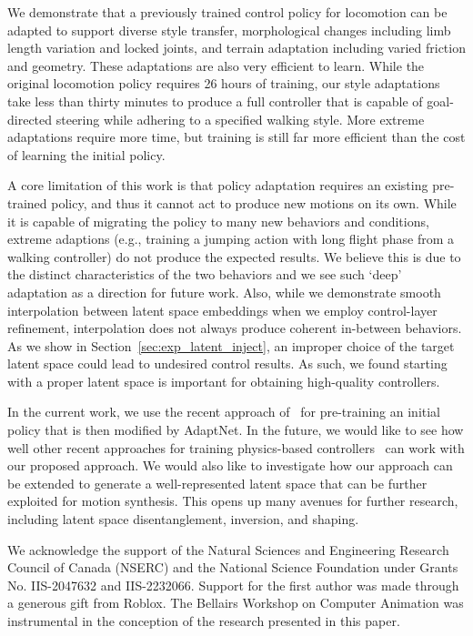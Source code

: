 We demonstrate that a previously trained control policy for %
locomotion can be adapted to support diverse style transfer, 
morphological changes including limb length variation and locked joints, and terrain adaptation including varied friction and geometry. %
These adaptations are also very efficient to learn. While the original locomotion policy requires 26 hours of training, our style adaptations take less than thirty minutes to produce a full controller that is capable of goal-directed steering while adhering to a specified walking style. %
More extreme adaptations require more time, but training is still far more efficient than the cost of learning the initial policy.



A core limitation of this work is that policy adaptation requires an existing pre-trained policy, and thus it cannot act to produce new motions on its own.  While it is capable of migrating the policy to many new behaviors and conditions, extreme adaptions (e.g., training a jumping action with long flight phase from a walking controller) do not produce the expected results.  We believe this is due to the distinct characteristics of the two behaviors and we see such `deep' adaptation as a direction for future work.  Also, while we demonstrate smooth interpolation between latent space embeddings when we employ control-layer refinement, interpolation does not always produce coherent in-between behaviors. 
As we show in Section~\ref{sec:exp_latent_inject},
an improper choice of the target latent space could lead to undesired control results. %
As such, we found starting with a proper latent space is important for obtaining high-quality controllers. 

In the current work, we use the recent approach of~\citet{composite} for pre-training an initial policy that is then modified by AdaptNet. In the future, we would like to see how well other recent approaches for training physics-based controllers~\cite{peng2022ase,peng2021amp,Yao2022ControlVAE} can work with our proposed approach. 
We would also like to investigate how our approach can be extended to generate a well-represented latent space that can be further exploited for motion synthesis. This opens up many avenues for further research, including latent space disentanglement, inversion, and shaping.

\begin{acks}
We acknowledge the support of the Natural Sciences and Engineering Research Council of Canada (NSERC) and the National Science Foundation under Grants No. IIS-2047632 and IIS-2232066.  Support for the first author was made through a generous gift from Roblox.  The Bellairs Workshop on Computer Animation was instrumental in the conception of the research presented in this paper.   
\end{acks}

